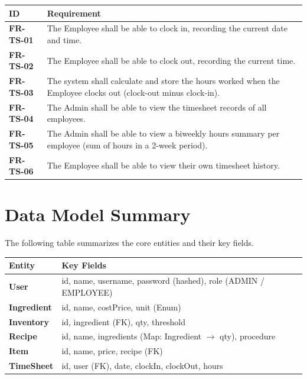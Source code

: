 \documentclass[12pt]{article}
\newcommand{\headerrow}{\rowcolor{darkblue}\color{white}\bfseries}
\begin{document}
\begin{longtable}{>{\bfseries}p{2cm} p{11cm}}
\toprule
\headerrow ID & Requirement \\
\midrule
\endhead
\rowcolor{lightgray} FR-TS-01 & The Employee shall be able to clock in, recording the current date and time. \\
FR-TS-02 & The Employee shall be able to clock out, recording the current time. \\
\rowcolor{lightgray} FR-TS-03 & The system shall calculate and store the hours worked when the Employee clocks out (clock-out minus clock-in). \\
FR-TS-04 & The Admin shall be able to view the timesheet records of all employees. \\
\rowcolor{lightgray} FR-TS-05 & The Admin shall be able to view a biweekly hours summary per employee (sum of hours in a 2-week period). \\
FR-TS-06 & The Employee shall be able to view their own timesheet history. \\
\bottomrule
\end{longtable}

\newpage

\section{Data Model Summary}

The following table summarizes the core entities and their key fields.

\begin{tabularx}{\textwidth}{>{\bfseries}p{2.5cm} X}
\toprule
\headerrow Entity & Key Fields \\
\midrule
\rowcolor{lightgray} User        & id, name, username, password (hashed), role (ADMIN / EMPLOYEE) \\
Ingredient  & id, name, costPrice, unit (Enum) \\
\rowcolor{lightgray} Inventory   & id, ingredient (FK), qty, threshold \\
Recipe      & id, name, ingredients (Map: Ingredient $\rightarrow$ qty), procedure \\
\rowcolor{lightgray} Item        & id, name, price, recipe (FK) \\
TimeSheet   & id, user (FK), date, clockIn, clockOut, hours \\
\bottomrule
\end{tabularx}
\end{document}
